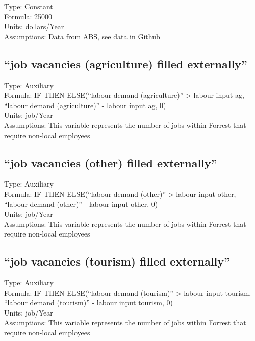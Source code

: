 \documentclass[
  11pt,
]{book}
\begin{document}
Type: Constant\\
Formula: 25000\\
Units: dollars/Year\\
Assumptions: Data from ABS, see data in Github

\hypertarget{job-vacancies-agriculture-filled-externally}{%
\subsection{``job vacancies (agriculture) filled externally''}\label{job-vacancies-agriculture-filled-externally}}

Type: Auxiliary\\
Formula: IF THEN ELSE(``labour demand (agriculture)'' \textgreater{} labour input ag, ``labour demand (agriculture)'' - labour input ag, 0)\\
Units: job/Year\\
Assumptions: This variable represents the number of jobs within Forrest that require non-local employees

\hypertarget{job-vacancies-other-filled-externally}{%
\subsection{``job vacancies (other) filled externally''}\label{job-vacancies-other-filled-externally}}

Type: Auxiliary\\
Formula: IF THEN ELSE(``labour demand (other)'' \textgreater{} labour input other, ``labour demand (other)'' - labour input other, 0)\\
Units: job/Year\\
Assumptions: This variable represents the number of jobs within Forrest that require non-local employees

\hypertarget{job-vacancies-tourism-filled-externally}{%
\subsection{``job vacancies (tourism) filled externally''}\label{job-vacancies-tourism-filled-externally}}

Type: Auxiliary\\
Formula: IF THEN ELSE(``labour demand (tourism)'' \textgreater{} labour input tourism, ``labour demand (tourism)'' - labour input tourism, 0)\\
Units: job/Year\\
Assumptions: This variable represents the number of jobs within Forrest that require non-local employees
\end{document}
